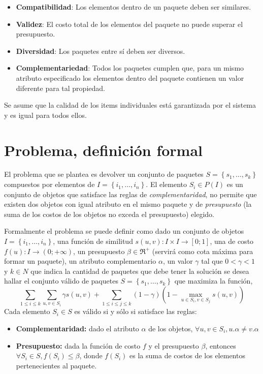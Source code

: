 \begin{itemize}
  \item \textbf{Compatibilidad}: Los elementos dentro de un paquete deben ser similares.
  \item \textbf{Validez}: El costo total de los elementos del paquete no puede superar el presupuesto.
  \item \textbf{Diversidad}: Los paquetes entre sí deben ser diversos.
  \item \textbf{Complementariedad}: Todos los paquetes cumplen que, para un mismo atributo especificado los elementos dentro del paquete contienen un valor diferente para tal propiedad.
\end{itemize}

Se asume que la calidad de los items individuales está garantizada por el sistema y es igual para todos ellos. 

\section{Problema, definición formal}
El problema que se plantea es devolver un conjunto de paquetes $S = \left\{s_1, \ldots, s_k\right\}$ compuestos por elementos de $I=\left\{i_1,\ldots, i_n\right\}$. El elemento $S_i \in P(I)$ es un conjunto de objetos que satisface las reglas de \textit{complementaridad}, no permite que existen dos objetos con igual atributo en el mismo paquete y de \textit{presupuesto} (la suma de los costos de los objetos no exceda el presupuesto) elegido.

Formalmente el problema se puede definir como dado un conjunto de objetos $I=\left\{i_1,\ldots, i_n\right\}$, una función de similitud $s(u,v): I \times I \rightarrow [0;1]$, una de costo $f(u): I \rightarrow (0;+\infty)$, un presupuesto $\beta \in \Re^{+}$ (servirá como cota máxima para formar un paquete), un atributo complementario $\alpha$, un valor $\gamma$ tal que $0 < \gamma < 1$ y $k \in N$ que indica la cantidad de paquetes que debe tener la solución se desea hallar el conjunto válido de paquetes $S = \left\{s_1, \ldots, s_k\right\}$ que maximiza la función,
\begin{equation} \label{des:eq-fnObj}
\sum_{1 \leq i \leq k}{\sum_{u,v \in S_i}{\gamma s(u,v)}} + \sum_{1 \leq i \leq j \leq k}{(1-\gamma) (1-\max_{u \in S_i, v \in S_j}{s(u,v)})}
\end{equation}
Cada elemento $S_i \in S$ es válido si y sólo si satisface las reglas:
\begin{itemize}
	\item \textbf{Complementaridad:} dado el atributo $\alpha$ de los objetos, $\forall u,v \in S_i, u.\alpha \neq v.\alpha$
	\item \textbf{Presupuesto:} dada la función de costo $f$ y el presupuesto $\beta$, entonces $\forall S_i \in S, f(S_i) \leq \beta$, donde $f(S_i)$ es la suma de costos de los elementos pertenecientes al paquete.
\end{itemize}		  

